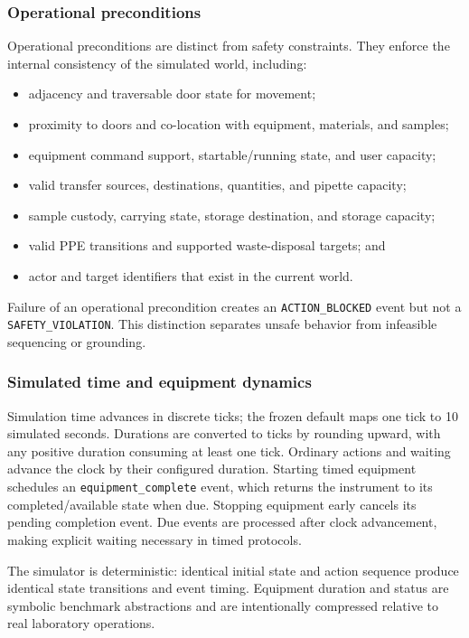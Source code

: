 \subsubsection{Operational preconditions}

Operational preconditions are distinct from safety constraints. They enforce
the internal consistency of the simulated world, including:
\begin{itemize}
    \item adjacency and traversable door state for movement;
    \item proximity to doors and co-location with equipment, materials, and
          samples;
    \item equipment command support, startable/running state, and user
          capacity;
    \item valid transfer sources, destinations, quantities, and pipette
          capacity;
    \item sample custody, carrying state, storage destination, and storage
          capacity;
    \item valid PPE transitions and supported waste-disposal targets; and
    \item actor and target identifiers that exist in the current world.
\end{itemize}
Failure of an operational precondition creates an
\texttt{ACTION\_BLOCKED} event but not a \texttt{SAFETY\_VIOLATION}. This
distinction separates unsafe behavior from infeasible sequencing or grounding.

\subsubsection{Simulated time and equipment dynamics}

Simulation time advances in discrete ticks; the frozen default maps one tick
to 10 simulated seconds. Durations are converted to ticks by rounding upward,
with any positive duration consuming at least one tick. Ordinary actions and
waiting advance the clock by their configured duration. Starting timed
equipment schedules an \texttt{equipment\_complete} event, which returns the
instrument to its completed/available state when due. Stopping equipment early
cancels its pending completion event. Due events are processed after clock
advancement, making explicit waiting necessary in timed protocols.

The simulator is deterministic: identical initial state and action sequence
produce identical state transitions and event timing. Equipment duration and
status are symbolic benchmark abstractions and are intentionally compressed
relative to real laboratory operations.

